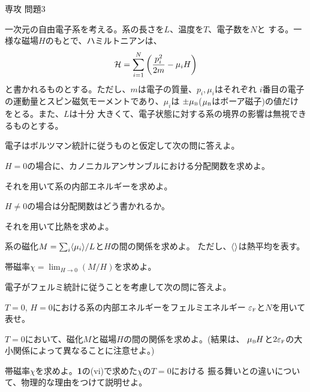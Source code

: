 \documentclass[fleqn]{jbook}
\begin{document}
\begin{question}{専攻 問題3}{}

\def\fermiE{\varepsilon\ssub{F}}

一次元の自由電子系を考える。系の長さを$L$、温度を$T$、電子数を$N$と
する。一様な磁場$H$のもとで、ハミルトニアンは、
%
\[ {\cal H} = \sum_{i=1}^N\left(\frac{p_i^2}{2m}-\mu_iH\right) \]
%
と書かれるものとする。ただし、$m$は電子の質量、$p_i,\mu_i$はそれぞれ
$i$番目の電子の運動量とスピン磁気モーメントであり、$\mu_i$は
$\pm\muB$($\muB$はボーア磁子)の値だけをとる。また、$L$は十分
大きくて、電子状態に対する系の境界の影響は無視できるものとする。



\begin{subquestions}
\SubQuestion
  電子はボルツマン統計に従うものと仮定して次の問に答えよ。

  \begin{subsubquestions}
  \SubSubQuestion
    $H=0$の場合に、カノニカルアンサンブルにおける分配関数を求めよ。

  \SubSubQuestion
    それを用いて系の内部エネルギーを求めよ。

  \SubSubQuestion
    $H\neq 0$の場合は分配関数はどう書かれるか。

  \SubSubQuestion
    それを用いて比熱を求めよ。

  \SubSubQuestion
    系の磁化$M=\sum_i\langle{\mu_i}\rangle/L$と$H$の間の関係を求めよ。
    ただし、$\langle{}\rangle$は熱平均を表す。

  \SubSubQuestion
    帯磁率$\chi=\lim_{H\to 0}(M/H)$を求めよ。

  \end{subsubquestions}


\SubQuestion
  電子がフェルミ統計に従うことを考慮して次の問に答えよ。

  \begin{subsubquestions}
  \SubSubQuestion
    $T=0,\,H=0$における系の内部エネルギーをフェルミエネルギー
    $\fermiE$と$N$を用いて表せ。

  \SubSubQuestion
    $T=0$において、磁化$M$と磁場$H$の間の関係を求めよ。(結果は、
    $\muB H$と$2\fermiE $の大小関係によって異なることに注意せよ。)

  \SubSubQuestion
    帯磁率$\chi$を求めよ。{\bf 1}の(vi)で求めた$\chi$の$T=0$における
    振る舞いとの違いについて、物理的な理由をつけて説明せよ。

  \end{subsubquestions}
\end{subquestions}
\end{question}
\end{document}

